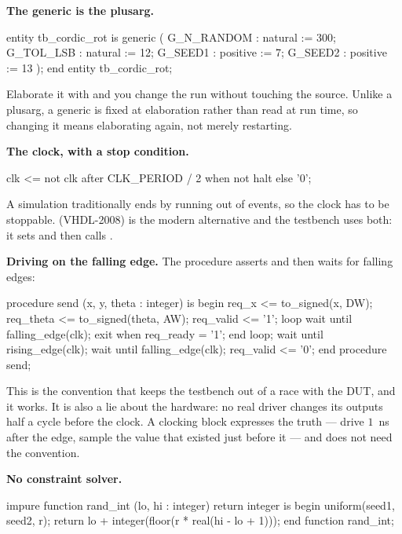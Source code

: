 \textbf{The generic is the \VHDL{} plusarg.}

\begin{vhdlcode}
entity tb_cordic_rot is
  generic (
    G_N_RANDOM : natural  := 300;
    G_TOL_LSB  : natural  := 12;
    G_SEED1    : positive := 7;
    G_SEED2    : positive := 13
  );
end entity tb_cordic_rot;
\end{vhdlcode}

Elaborate it with  and you
change the run without touching the source. Unlike a \SV{} plusarg, a generic
is fixed at elaboration rather than read at run time, so changing it means
elaborating again, not merely restarting.

\textbf{The clock, with a stop condition.}

\begin{vhdlcode}
clk <= not clk after CLK_PERIOD / 2 when not halt else '0';
\end{vhdlcode}

A \VHDL{} simulation traditionally ends by running out of events, so the
clock has to be stoppable.  (VHDL-2008) is the modern
alternative and the testbench uses both: it sets  and then calls
.

\textbf{Driving on the falling edge.} The  procedure asserts
 and then waits for falling edges:

\begin{vhdlcode}
procedure send (x, y, theta : integer) is
begin
  req_x     <= to_signed(x, DW);
  req_theta <= to_signed(theta, AW);
  req_valid <= '1';
  loop
    wait until falling_edge(clk);
    exit when req_ready = '1';
  end loop;
  wait until rising_edge(clk);
  wait until falling_edge(clk);
  req_valid <= '0';
end procedure send;
\end{vhdlcode}

This is the convention that keeps the testbench out of a race with the DUT,
and it works. It is also a lie about the hardware: no real driver changes its
outputs half a cycle before the clock. A \SV{} clocking block expresses the
truth --- drive $1$~ns after the edge, sample the value that existed just
before it --- and does not need the convention.

\textbf{No constraint solver.}

\begin{vhdlcode}
impure function rand_int (lo, hi : integer) return integer is
begin
  uniform(seed1, seed2, r);
  return lo + integer(floor(r * real(hi - lo + 1)));
end function rand_int;
\end{vhdlcode}

